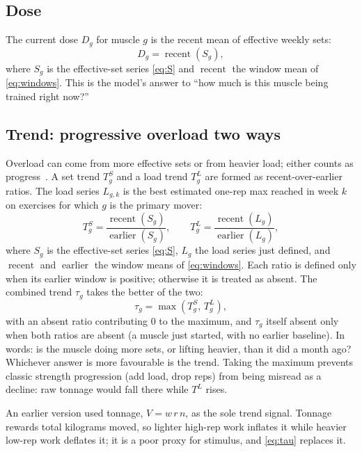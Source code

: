 \documentclass[11pt,a4paper]{article}
\newcommand{\recent}{\operatorname{recent}}
\newcommand{\earlier}{\operatorname{earlier}}
\begin{document}
\subsection{Dose}
The current dose $D_g$ for muscle $g$ is the recent mean of effective weekly sets:
\begin{equation}\label{eq:dose}
D_g=\recent(S_g),
\end{equation}
where $S_g$ is the effective-set series \eqref{eq:S} and $\recent$ the window mean of \eqref{eq:windows}. This is the model's answer to ``how much is this muscle being trained right now?''

\subsection{Trend: progressive overload two ways}
Overload can come from more effective sets or from heavier load; either counts as progress~\cite{plotkin,sch10}. A set trend $T^{S}_{g}$ and a load trend $T^{L}_{g}$ are formed as recent-over-earlier ratios. The load series $L_{g,k}$ is the best estimated one-rep max reached in week $k$ on exercises for which $g$ is the primary mover:
\begin{equation}\label{eq:trends}
T^{S}_{g}=\frac{\recent(S_g)}{\earlier(S_g)},
\qquad
T^{L}_{g}=\frac{\recent(L_g)}{\earlier(L_g)},
\end{equation}
where $S_g$ is the effective-set series \eqref{eq:S}, $L_g$ the load series just defined, and $\recent$ and $\earlier$ the window means of \eqref{eq:windows}. Each ratio is defined only when its earlier window is positive; otherwise it is treated as absent. The combined trend $\tau_g$ takes the better of the two:
\begin{equation}\label{eq:tau}
\tau_g=\max\!\left(T^{S}_{g},\,T^{L}_{g}\right),
\end{equation}
with an absent ratio contributing $0$ to the maximum, and $\tau_g$ itself absent only when both ratios are absent (a muscle just started, with no earlier baseline). In words: is the muscle doing more sets, or lifting heavier, than it did a month ago? Whichever answer is more favourable is the trend. Taking the maximum prevents classic strength progression (add load, drop reps) from being misread as a decline: raw tonnage would fall there while $T^{L}$ rises.

An earlier version used tonnage, $V=w\,r\,n$, as the sole trend signal. Tonnage rewards total kilograms moved, so lighter high-rep work inflates it while heavier low-rep work deflates it; it is a poor proxy for stimulus, and \eqref{eq:tau} replaces it.
\end{document}
